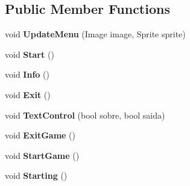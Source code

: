 \subsection*{Public Member Functions}
\begin{DoxyCompactItemize}
\item 
\mbox{\label{class_menu_script_a7fd4869b3bcf92a8a71a2bcbb7758770}} 
void {\bfseries Update\+Menu} (Image image, Sprite sprite)
\item 
\mbox{\label{class_menu_script_a7e50d38073f9796c3035ab0b5a562003}} 
void {\bfseries Start} ()
\item 
\mbox{\label{class_menu_script_ab87c9e111bf4e379a062c7d135551534}} 
void {\bfseries Info} ()
\item 
\mbox{\label{class_menu_script_a140002b1c2186b0223d79dddccb602fd}} 
void {\bfseries Exit} ()
\item 
\mbox{\label{class_menu_script_a672eb8f935132634bc958abba0804373}} 
void {\bfseries Text\+Control} (bool sobre, bool saida)
\item 
\mbox{\label{class_menu_script_a3ff96c7af5b82f1b2bb09b02ea8a7511}} 
void {\bfseries Exit\+Game} ()
\item 
\mbox{\label{class_menu_script_a9347d5e7759ebceb5b1266faca8d336b}} 
void {\bfseries Start\+Game} ()
\item 
\mbox{\label{class_menu_script_a59a03a9700356cfe75901d841a7fda97}} 
void {\bfseries Starting} ()
\end{DoxyCompactItemize}
